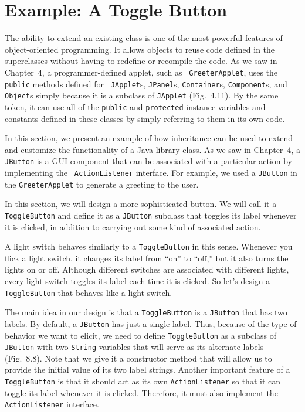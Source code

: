 \section{Example: A Toggle Button}
\label{sec-toggle}
\label{pg-sec-toggle}

\noindent The ability to extend an existing class is one of the most
 powerful features of object-oriented
programming.  It allows objects to reuse code defined in the
superclasses without having to redefine or recompile the code.  As we
saw in Chapter~4, a programmer-defined applet, such as {\tt
GreeterApplet}, uses the {\tt public} methods defined for {\tt
JApplet}s, {\tt JPanel}s, {\tt Container}s, {\tt Component}s, and {\tt
Object}s simply because it is a subclass of {\tt JApplet}
(Fig.~4.11).  By the same token, it can use all of the {\tt public}
and {\tt protected} instance variables and constants defined in these
classes by simply referring to them in its own code.

In this section, we present an example of how inheritance can be used
to extend and customize the functionality of a Java library class. As
we saw in Chapter~4, a {\tt JButton} is a GUI component that can be
associated with a particular action by implementing the {\tt
ActionListener} interface.  For example, we used a {\tt JButton} in
the {\tt GreeterApplet} to generate a greeting to the user.

In this section, we will design a more sophisticated button. 
We will call it a  {\tt ToggleButton} and define it as a {\tt JButton} subclass that
toggles its label whenever it is clicked, in addition to
carrying out some kind of associated action.

A light switch behaves similarly to a {\tt ToggleButton} in this
sense.  Whenever you flick a light switch, it changes its label from
``on'' to ``off,'' but it also turns the lights on or off.  Although
different switches are associated with different lights, every light
switch toggles its label each time it is clicked.  So let's design a
{\tt ToggleButton} that behaves like a light switch.

The main idea in our design is that a {\tt ToggleButton} is a
{\tt JButton} that has two labels. By default, a {\tt JButton} has just
a single label. Thus, because of the type of behavior we want to elicit,
we need to define {\tt ToggleButton} as a subclass of
{\tt JButton} with two {\tt String} variables that will serve as its
alternate labels (Fig.~8.8). Note that we give it a constructor
method that will allow us to provide the initial value of its two
label strings. Another important feature of a {\tt ToggleButton} is
that it should act as its own {\tt ActionListener} so that it can
toggle its label whenever it is clicked. Therefore, it must also
implement the {\tt ActionListener} interface.  

